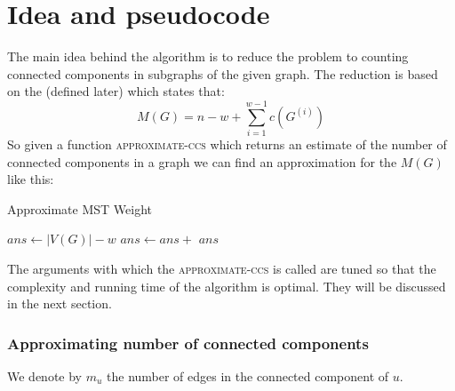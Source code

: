 \section{Idea and pseudocode}

The main idea behind the algorithm is to reduce the problem to counting connected components in subgraphs of the given graph. The reduction is based on the  (defined later) which states that: 
\begin{equation}
    M(G) = n - w + \sum\limits_{i=1}^{w-1}c(G^{(i)})
\end{equation}
So given a function \textsc{approximate-ccs} which returns an estimate of the number of connected components in a graph we can find an approximation for the $M(G)$ like this:
\begin{algorithm}[H]
\caption{Approximate MST Weight}
\begin{algorithmic}[1]
    \State $ans \gets |V(G)| - w$
        \State $ans \gets ans +$ 
    \EndFor
    \State \Return $ans$
\EndFunction
\end{algorithmic}
\end{algorithm}

The arguments with which the \textsc{approximate-ccs} is called are tuned so that the complexity and running time of the algorithm is optimal. They will be discussed in the next section.

\subsubsection{Approximating number of connected components}
We denote by $m_u$  the number of edges in the connected component of $u$.

